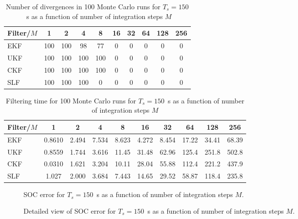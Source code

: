 \documentclass[../zhang_thesis.tex]{subfiles}
\begin{document}
\clearpage

\begin{table}[h]
\centering
\caption{Number of divergences in 100 Monte Carlo runs for $T_s=150$~s as a function of number of integration steps $M$}
\begin{tabular}{@{}l*{9}{c}@{}}
\toprule
Filter/$M$ & 1   & 2   & 4   & 8   & 16 & 32 & 64 & 128 & 256 \\
\midrule
EKF        & 100 & 100 & 98  & 77  & 0  & 0  & 0  & 0   & 0   \\
UKF        & 100 & 100 & 100 & 100 & 0  & 0  & 0  & 0   & 0   \\
CKF        & 100 & 100 & 100 & 100 & 0  & 0  & 0  & 0   & 0   \\
SLF        & 100 & 100 & 100 & 0   & 0  & 0  & 0  & 0   & 0   \\
\bottomrule
\end{tabular}
\label{tab:div_150}
\end{table}

\begin{table}[h]
\centering
\caption{Filtering time for 100 Monte Carlo runs for $T_s=150$~s as a function of number of integration steps $M$}
\begin{tabular}{@{}lccccccccc@{}}
\toprule
Filter/$M$ & 1      & 2     & 4     & 8     & 16    & 32    & 64    & 128   & 256   \\ \midrule
EKF        & 0.8610 & 2.494 & 7.534 & 8.623 & 4.272 & 8.454 & 17.22 & 34.41 & 68.39 \\
UKF        & 0.8559 & 1.744 & 3.616 & 11.45 & 31.48 & 62.96 & 125.4 & 251.8 & 502.8 \\
CKF        & 0.0310 & 1.621 & 3.204 & 10.11 & 28.04 & 55.88 & 112.4 & 221.2 & 437.9 \\
SLF        & 1.027  & 2.000 & 3.684 & 7.443 & 14.65 & 29.52 & 58.87 & 118.4 & 235.8 \\ \bottomrule
\end{tabular}
\label{tab:time_150}
\end{table}

\clearpage

\begin{figure}[p]
\centering

\caption{SOC error for $T_s=150$~s as a function of number of integration steps $M$.}
\label{fig:mrmse_150}
\end{figure}

\begin{figure}[p]
\centering

\caption{Detailed view of SOC error for $T_s=150$~s as a function of number of integration steps $M$.}
\label{fig:mrmse_det_150}
\end{figure}
\end{document}
